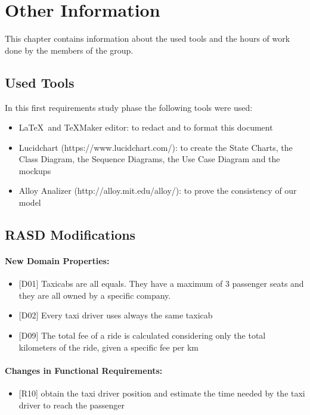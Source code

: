 \chapter{Other Information} \label{chap7}
This chapter contains information about the used tools and the hours of work done by the members of the group.

\section{Used Tools}
In this first requirements study phase the following tools were used:

\begin{itemize}
	\item \LaTeX\ and TeXMaker editor: to redact and to format this document
	\item Lucidchart (https://www.lucidchart.com/): to create the State Charts, the Class Diagram, the Sequence Diagrams, the Use Case Diagram and the mockups
	\item Alloy Analizer (http://alloy.mit.edu/alloy/): to prove the consistency of our model
\end{itemize}

\section{RASD Modifications}
\subsubsection{New Domain Properties:}
\begin{itemize}
	\item {[D01]} Taxicabs are all equals. They have a maximum of 3 passenger seats and they are all owned by a specific company.
	\item {[D02]} Every taxi driver uses always the same taxicab
	\item {[D09]} The total fee of a ride is calculated considering only the total kilometers of the ride, given a specific fee per km
\end{itemize}

\subsubsection{Changes in Functional Requirements:}
\begin{itemize}
	\item {[R10]} obtain the taxi driver position and estimate the time needed by the taxi driver to reach the passenger
\end{itemize}

